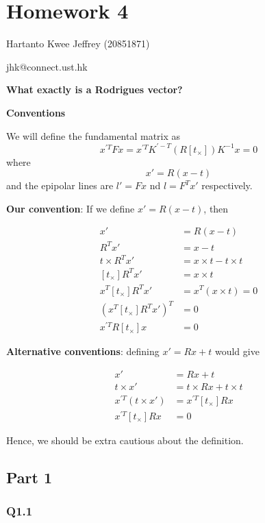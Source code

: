 \documentclass{scrbook}
\begin{document}
\chapter{Homework 4}

Hartanto Kwee Jeffrey (20851871)

jhk@connect.ust.hk

\textbf{What exactly is a Rodrigues vector?}

\textbf{Conventions}

We will define the fundamental matrix as 
\begin{equation*}
x^{'T}Fx=x^{'T}K^{'-T}\left(R\left[t_{\times }\right]\right)K^{-1}x=0
\end{equation*}
where 
\begin{equation*}
x'=R(x-t)
\end{equation*}
and the epipolar lines are $l'=Fx$ nd $l=F^{T}x'$ respectively.

\textbf{Our convention}: If we define $x'=R(x-t)$, then

\begin{align*}
x'&=R\left(x-t\right) \\
R^{T}x'&=x-t \\
t\times R^{T}x'&=x\times t-t\times t \\
\left[t_{\times }\right]R^{T}x'&=x\times t \\
x^{T}\left[t_{\times }\right]R^{T}x'&=x^{T}\left(x\times t\right)=0 \\
\left(x^{T}\left[t_{\times }\right]R^{T}x'\right)^{T}&=0 \\
x^{'T}R\left[t_{\times }\right]x&=0 
\end{align*}

\textbf{Alternative conventions}: defining $x'=Rx+t$ would give

\begin{align*}
x'&=Rx+t \\
t\times x'&=t\times Rx+t\times t \\
x^{'T}\left(t\times x'\right)&=x^{'T}\left[t_{\times }\right]Rx \\
x^{'T}\left[t_{\times }\right]Rx&=0 
\end{align*}

Hence, we should be extra cautious about the definition.

\section{Part 1}

\subsection{Q1.1}
\end{document}
